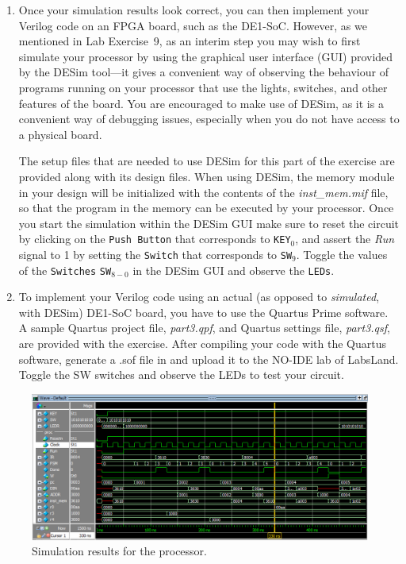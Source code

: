 \documentclass[epsfig,10pt,fullpage]{article} \addtolength{\textwidth}{1.5in}
\begin{document}
\begin{enumerate}
An example simulation result for a correctly-designed circuit 
is given in Figure~\ref{fig:part3}. It shows the execution of the first four instructions
in Figure~\ref{fig:assembly}.

\item Once your simulation results look correct, you can then implement your Verilog
code on an FPGA board, such as the DE1-SoC. However, as we mentioned in Lab Exercise~9, as
an interim step you may wish to first simulate your processor by using the graphical user
interface (GUI) provided by the DESim tool---it gives a convenient way of observing the behaviour 
of programs running on your processor that use the lights, switches, and other features of 
the board. You are encouraged to make use of DESim, as it
is a convenient way of debugging issues, especially when you do not have access to a 
physical board.

The setup files that are needed to use DESim for this part of the exercise are provided along
with its design files.  When using DESim, the memory module in your design will be initialized with
the contents of the {\it inst\_mem.mif} file, so that the program in the memory 
can be executed by your processor. Once you start the simulation within the DESim GUI make sure to 
reset the circuit by clicking on the \texttt{Push Button} that corresponds to
\texttt{KEY}$_0$, and assert the {\it Run} signal to 1 by setting the \texttt{Switch}
that corresponds to \texttt{SW}$_9$. Toggle the values of the \texttt{Switches}
\texttt{SW}$_{8-0}$ in the DESim GUI and observe the \texttt{LEDs}. 

\item
To implement your Verilog code using an actual (as opposed to {\it simulated}, with DESim) 
DE1-SoC board, you have to use the Quartus Prime software.
A sample Quartus project file, {\it part3.qpf}, and Quartus
settings file, {\it part3.qsf}, are provided with the exercise. After compiling your code 
with the Quartus software, generate a .sof file in and upload it to the NO-IDE lab of LabsLand. Toggle the SW switches and observe the LEDs to test your circuit.
\end{enumerate}

\begin{figure}[H]
	\begin{center}
		\includegraphics[width=\textwidth]{figures/part3.png}
	\end{center}
	\caption{Simulation results for the processor.}
	\label{fig:part3}
\end{figure}
\end{document}
